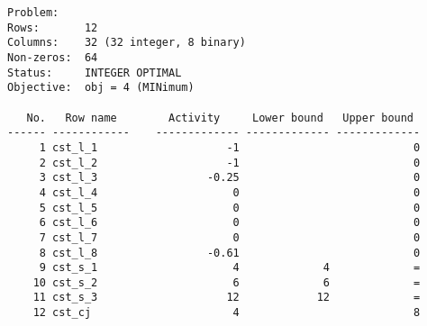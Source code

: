 \documentclass[12pt, openany]{report}
\begin{document}
\begin{lstlisting}
Problem:    
Rows:       12
Columns:    32 (32 integer, 8 binary)
Non-zeros:  64
Status:     INTEGER OPTIMAL
Objective:  obj = 4 (MINimum)

   No.   Row name        Activity     Lower bound   Upper bound
------ ------------    ------------- ------------- -------------
     1 cst_l_1                    -1                           0 
     2 cst_l_2                    -1                           0 
     3 cst_l_3                 -0.25                           0 
     4 cst_l_4                     0                           0 
     5 cst_l_5                     0                           0 
     6 cst_l_6                     0                           0 
     7 cst_l_7                     0                           0 
     8 cst_l_8                 -0.61                           0 
     9 cst_s_1                     4             4             = 
    10 cst_s_2                     6             6             = 
    11 cst_s_3                    12            12             = 
    12 cst_cj                      4                           8 


\end{lstlisting}
\end{document}
